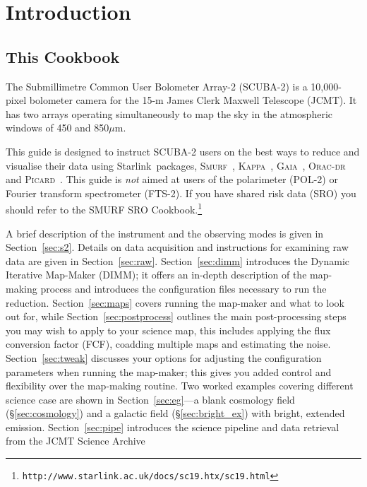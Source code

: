 \documentclass[twoside,11pt]{article}
\newcommand{\htmladdnormallink}[2]{#1}
\newcommand{\htmlref}[2]{#1}
\newenvironment{latexonly}{}{}
\newcommand{\latex}[1]{#1}
\newcommand{\latexhtml}[2]{#1}
\newcommand{\xref}[3]{#1}
\newcommand{\xlabel}[1]{}
\renewcommand{\_}{\texttt{\symbol{95}}}
\newcommand{\starlink}{\htmladdnormallink{Starlink}{http://starlink.jach.hawaii.edu}}
\newcommand{\gaia}{\xref{\textsc{Gaia}}{sun214}{}}
\newcommand{\Kappa}{\xref{\textsc{Kappa}}{sun95}{}}
\newcommand{\oracdr}{\htmladdnormallink{\textsc{Orac-dr}}{http://www.oracdr.org/oracdr}}
\newcommand{\picard}{\xref{\textsc{Picard}}{sun265}{}}
\newcommand{\smurf}{\xref{\textsc{Smurf}}{sun258}{}}
\newcommand{\cref}[3]{\latexhtml{#1~\ref{#2}}{\htmlref{#3}{#2}}}
\renewcommand{\thepage}{\roman{page}}
\begin{document}
\cleardoublepage
\renewcommand{\thepage}{\arabic{page}}
\setcounter{page}{1}

\section{\xlabel{introduction}Introduction}
\label{sec:intro}

\subsection{\xlabel{using_guide}This Cookbook}

The Submillimetre Common User Bolometer Array-2 (SCUBA-2) is a
10,000-pixel bolometer camera for the 15-m James Clerk Maxwell
Telescope (JCMT). It has two arrays operating simultaneously to map
the sky in the atmospheric windows of 450 and 850$\mu$m.

This guide is designed to instruct SCUBA-2 users on the best ways to
reduce and visualise their data using \starlink\ packages,
\smurf\ \cite{smurf}, \Kappa\ \cite{kappa}, \gaia\ \cite{gaia}, \oracdr\ \cite{oracdr} and \picard\
\cite{picard}. This guide is {\em not} aimed at users of the
polarimeter (POL-2) or Fourier transform spectrometer (FTS-2). If you
have shared risk data (SRO) you should refer to the
\xref{SMURF SRO
Cookbook.}{sc19}{}\latex{\footnote{\texttt{http://www.starlink.ac.uk/docs/sc19.htx/sc19.html}}}

A brief description of the instrument and the observing modes is given
in \cref{Section}{sec:s2}{an Overview}. Details on data acquisition and
instructions for examining raw data are given in
\cref{Section}{sec:raw}{Raw SCUBA-2 data}.
\cref{Section}{sec:dimm}{This page} introduces the Dynamic Iterative Map-Maker
(DIMM); it offers an in-depth description of the map-making
process and introduces the configuration files necessary to run the
reduction. \cref{Section}{sec:maps}{Reducing your Data} covers running
the map-maker and what to look out for, while
\cref{Section}{sec:postprocess}{Post-processing Reduction Steps}
outlines the main post-processing steps you may wish to apply to your
science map, this includes applying the flux conversion
factor (FCF), coadding multiple maps and estimating the noise.
\cref{Section}{sec:tweak}{Tweaking the configuration file}
discusses your options for adjusting the configuration
parameters when running the map-maker; this gives you added control
and flexibility over the map-making routine. Two worked examples
covering different science case are shown in
\cref{Section}{sec:eg}{Examples}---a
\htmlref{blank cosmology field}{sec:cosmology}
\begin{latexonly}
(\S\ref{sec:cosmology})
\end{latexonly}
and a \htmlref{galactic field}{sec:bright_ex}
\begin{latexonly}
(\S\ref{sec:bright_ex})
\end{latexonly}
with bright, extended emission.
\cref{Section}{sec:pipe}{SCUBA-2 Pipeline} introduces the science
pipeline and data retrieval from the
\htmladdnormallink{JCMT Science Archive}{http://www3.cadc-ccda.hia-iha.nrc-cnrc.gc.ca/jcmt/}
\end{document}
